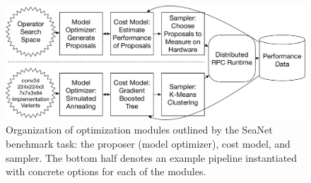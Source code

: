 \begin{figure}[tb]
\includegraphics[width=\textwidth]{sys_diagrams/plug.pdf}
\caption{
Organization of optimization modules outlined by the SeaNet benchmark task: the proposer (model optimizer), cost model, and sampler. The bottom half denotes an example pipeline instantiated with concrete options for each of the modules.}
\label{fig:overview}
\end{figure}

